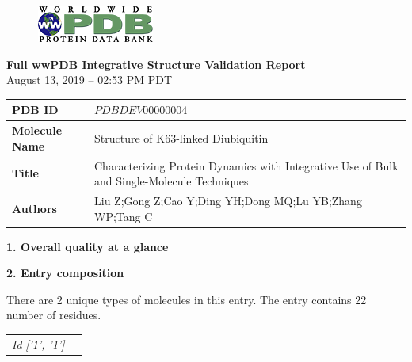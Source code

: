 \documentclass[12pt,a4paper]{article}
\begin{document}
\begin{center} 	
	\vspace*{5px}
	\begin{figure}
	\centering
        	\includegraphics[totalheight=1.2cm]{images/PDB.png}\\
   	 \label{fig:verticalcell}
	\end{figure}
	\textbf{ \huge Full wwPDB Integrative Structure Validation Report } \\
	\vspace*{25px}
	\large {August 13, 2019 --  02:53 PM PDT} \\
	\vspace*{40px}
\end{center}
\begin{longtable}{ p{} | p{} }
	{\textbf{PDB ID}} & $PDBDEV00000004$\\
	\hline
	{\textbf{Molecule Name}} & Structure of K63-linked Diubiquitin\\
        \hline
	{\textbf{Title}} & Characterizing Protein Dynamics with Integrative Use of Bulk and Single-Molecule Techniques\\
	\hline
	{\textbf{Authors}} & Liu Z;Gong Z;Cao Y;Ding YH;Dong MQ;Lu YB;Zhang WP;Tang C\\
\end{longtable}
\pagebreak









\textbf{ \Large 1. Overall quality at a glance}  \\
\vspace{10px}










\textbf{ \Large 2. Entry composition}  \\
\vspace{10px}

\large{There are 2 unique types of molecules in this entry. The entry contains 22 number of residues.} \\

\begin{longtable}{ p{} | p{} }

           \hline
   	     \textit{Id} 
      \textit{['1', '1']} 
    
  \hline

\end{longtable}
\end{document}
